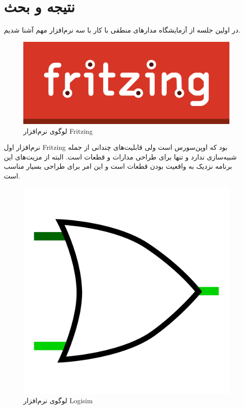 \chapter{نتیجه و بحث}
در اولین جلسه از آزمایشگاه مدارهای منطقی با کار با سه نرم‌افزار مهم آشنا شدیم.

\begin{figure}[h]
\centering
\includegraphics[scale=0.4]{conclusion/fritzing.png}
\caption{
لوگوی نرم‌افزار
Fritzing}
\end{figure}

نرم‌افزار اول
Fritzing
بود که اوپن‌سورس است ولی قابلیت‌های چندانی از جمله شبیه‌سازی ندارد و تنها برای طراحی مدارات و قطعات است. البته از مزیت‌های این برنامه نزدیک به واقعیت بودن قطعات است و این امر برای طراحی بسیار مناسب است.

\begin{figure}[h]
\centering
\includegraphics[scale=0.035]{conclusion/logisim.png}
\caption{
لوگوی نرم‌افزار
Logisim}
\end{figure}

